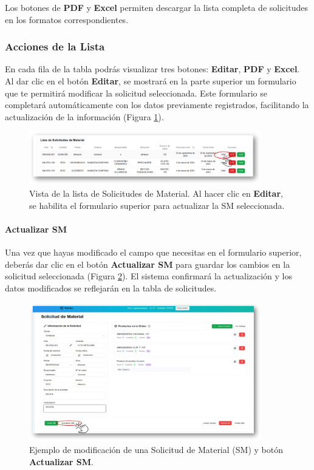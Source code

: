 Los botones de \textbf{PDF} y \textbf{Excel} permiten descargar la lista completa de solicitudes en los formatos correspondientes.  

\subsubsection*{Acciones de la Lista}
En cada fila de la tabla podrás visualizar tres botones: \textbf{Editar}, \textbf{PDF} y \textbf{Excel}.  
Al dar clic en el botón \textbf{Editar}, se mostrará en la parte superior un formulario que te permitirá modificar la solicitud seleccionada.  
Este formulario se completará automáticamente con los datos previamente registrados, facilitando la actualización de la información (Figura \ref{fig:lista_sm}).

\begin{figure}[H]
    \centering
    \includegraphics[width=0.9\textwidth]{imgs/Almacen_General/Solicitudes_de_materia_SM/actualizar_sm.png}
    \caption{Vista de la lista de Solicitudes de Material. Al hacer clic en \textbf{Editar}, se habilita el formulario superior para actualizar la SM seleccionada.}
    \label{fig:lista_sm}
\end{figure}

\paragraph{Actualizar SM}
Una vez que hayas modificado el campo que necesitas en el formulario superior, deberás dar clic en el botón \textbf{Actualizar SM} para guardar los cambios en la solicitud seleccionada (Figura \ref{fig:update_sm}).  
El sistema confirmará la actualización y los datos modificados se reflejarán en la tabla de solicitudes.

\begin{figure}[H]
    \centering
    \includegraphics[width=0.9\textwidth]{imgs/Almacen_General/Solicitudes_de_materia_SM/actualizar_sm_full.png}
    \caption{Ejemplo de modificación de una Solicitud de Material (SM) y botón \textbf{Actualizar SM}.}
    \label{fig:update_sm}
\end{figure}


